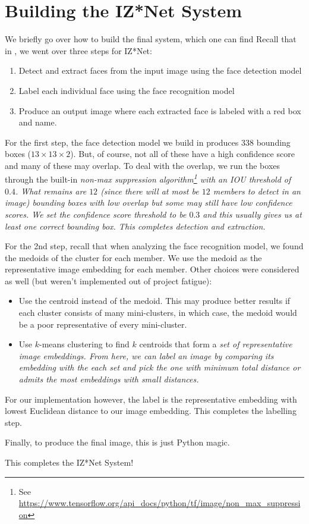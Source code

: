 \section{Building the IZ*Net System}\label{Section:Building-the-IZNet-System}

We briefly go over how to build the final system, which one can find \href{https://github.com/nicholaspun/IZ-Net/blob/master/notebooks/IZ_NET.ipynb}{}
Recall that in , we went over three steps for IZ*Net:
\begin{enumerate}
    \item Detect and extract faces from the input image using the face detection model
    \item Label each individual face using the face recognition model
    \item Produce an output image where each extracted face is labeled with a red box and name.
\end{enumerate}

For the first step, the face detection model we build in  produces $338$ bounding boxes ($13 \times 13 \times 2$).
But, of course, not all of these have a high confidence score and many of these may overlap.
To deal with the overlap, we run the boxes through the built-in \it{non-max suppression} algorithm\footnote{See \url{https://www.tensorflow.org/api_docs/python/tf/image/non_max_suppression}} with an IOU threshold of $0.4$.
What remains are $12$ (since there will at most be $12$ members to detect in an image) bounding boxes with low overlap but some may still have low confidence scores.
We set the confidence score threshold to be $0.3$ and this usually gives us at least one correct bounding box.
This completes detection and extraction.

For the 2nd step, recall that when analyzing the face recognition model, we found the medoids of the cluster for each member.
We use the medoid as the representative image embedding for each member.
Other choices were considered as well (but weren't implemented out of project fatigue):
\begin{itemize}
    \item Use the centroid instead of the medoid.
    This may produce better results if each cluster consists of many mini-clusters, in which case, the medoid would be a poor representative of every mini-cluster.

    \item Use $k$-means clustering to find $k$ centroids that form a \it{set} of representative image embeddings.
    From here, we can label an image by comparing its embedding with the each set and pick the one with minimum total distance or admits the most embeddings with small distances.
\end{itemize}
For our implementation however, the label is the representative embedding with lowest Euclidean distance to our image embedding.
This completes the labelling step.

Finally, to produce the final image, this is just Python magic.

This completes the IZ*Net System!